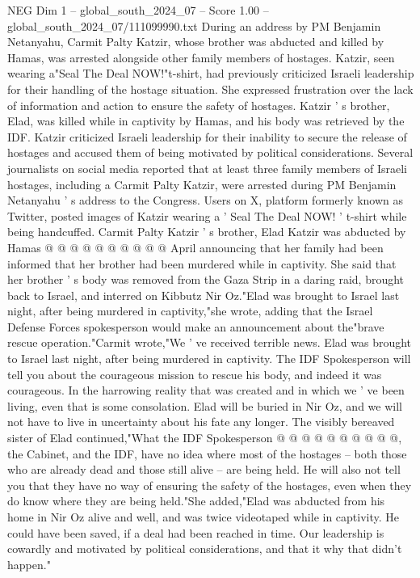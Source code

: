 \begin{textsample}{NEG Dim 1 – global\_south\_2024\_07 – Score 1.00 – global\_south\_2024\_07/111099990.txt}  \label{ex:f1_neg_275}
During an address by PM Benjamin Netanyahu, Carmit Palty Katzir, whose brother was abducted and killed by Hamas, was arrested alongside other family members of hostages.
Katzir, seen wearing a"Seal The Deal NOW!"t-shirt, had previously criticized Israeli leadership for their handling of the hostage situation.
She expressed frustration over the lack of information and action to ensure the safety of hostages.
Katzir ' s brother, Elad, was killed while in captivity by Hamas, and his body was retrieved by the IDF.
Katzir criticized Israeli leadership for their inability to secure the release of hostages and accused them of being motivated by political considerations.
Several journalists on social media reported that at least three family members of Israeli hostages, including a Carmit Palty Katzir, were arrested during PM Benjamin Netanyahu ' s address to the Congress.
Users on X, platform formerly known as Twitter, posted images of Katzir wearing a ' Seal The Deal NOW! ' t-shirt while being handcuffed.
Carmit Palty Katzir ' s brother, Elad Katzir was abducted by Hamas @ @ @ @ @ @ @ @ @ @ April announcing that her family had been informed that her brother had been murdered while in captivity.
She said that her brother ' s body was removed from the Gaza Strip in a daring raid, brought back to Israel, and interred on Kibbutz Nir Oz."Elad was brought to Israel last night, after being murdered in captivity,"she wrote, adding that the Israel Defense Forces spokesperson would make an announcement about the"brave rescue operation."Carmit wrote,"We ' ve received terrible news.
Elad was brought to Israel last night, after being murdered in captivity.
The IDF Spokesperson will tell you about the courageous mission to rescue his body, and indeed it was courageous.
In the harrowing reality that was created and in which we ' ve been living, even that is some consolation.
Elad will be buried in Nir Oz, and we will not have to live in uncertainty about his fate any longer.
The visibly bereaved sister of Elad continued,"What the IDF Spokesperson @ @ @ @ @ @ @ @ @ @, the Cabinet, and the IDF, have no idea where most of the hostages -- both those who are already dead and those still alive -- are being held.
He will also not tell you that they have no way of ensuring the safety of the hostages, even when they do know where they are being held."She added,"Elad was abducted from his home in Nir Oz alive and well, and was twice videotaped while in captivity.
He could have been saved, if a deal had been reached in time.
Our leadership is cowardly and motivated by political considerations, and that it why that didn't happen."

\end{textsample}
